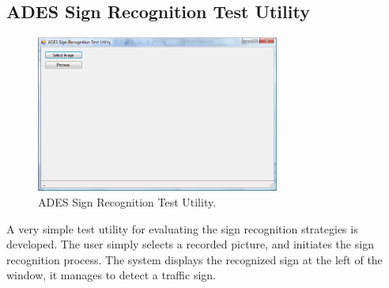 \documentclass[a4paper,oneside,12pt]{report}
\begin{document}
\subsection{ADES Sign Recognition Test Utility}
\begin{figure}
\begin{center}
\includegraphics[width=80mm]{img/adestestapp.eps}
\caption{ADES Sign Recognition Test Utility.}
\label{fig:adestestapp}
\end{center}
\end{figure}
A very simple test utility for evaluating the sign recognition strategies is developed. The user simply selects a recorded picture, and initiates the sign recognition process. The system displays the recognized sign at the left of the window, it manages to detect a traffic sign.
\end{document}
